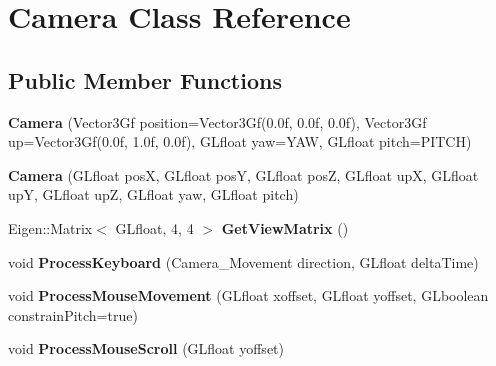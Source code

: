 \hypertarget{classCamera}{}\section{Camera Class Reference}
\label{classCamera}
\subsection*{Public Member Functions}
\begin{DoxyCompactItemize}
\item 
\mbox{\label{classCamera_a852d8c105b562be494204cac8518b66f}} 
{\bfseries Camera} (Vector3\+Gf position=Vector3\+Gf(0.\+0f, 0.\+0f, 0.\+0f), Vector3\+Gf up=\+Vector3\+Gf(0.\+0f, 1.\+0f, 0.\+0f), G\+Lfloat yaw=\+Y\+A\+W, G\+Lfloat pitch=\+P\+I\+T\+C\+H)
\item 
\mbox{\label{classCamera_a1efd973829c22d5fe15a26ede3357ee5}} 
{\bfseries Camera} (G\+Lfloat posX, G\+Lfloat posY, G\+Lfloat posZ, G\+Lfloat upX, G\+Lfloat upY, G\+Lfloat upZ, G\+Lfloat yaw, G\+Lfloat pitch)
\item 
\mbox{\label{classCamera_af040480b69b4235d9bd203bf6775e79a}} 
Eigen\+::\+Matrix$<$ G\+Lfloat, 4, 4 $>$ {\bfseries Get\+View\+Matrix} ()
\item 
\mbox{\label{classCamera_ac7e9a7f3e63c670fd695a8f03d02dbdf}} 
void {\bfseries Process\+Keyboard} (Camera\+\_\+\+Movement direction, G\+Lfloat delta\+Time)
\item 
\mbox{\label{classCamera_a97ffbf8d8935fc63bd2ca71a4268eec4}} 
void {\bfseries Process\+Mouse\+Movement} (G\+Lfloat xoffset, G\+Lfloat yoffset, G\+Lboolean constrain\+Pitch=true)
\item 
\mbox{\label{classCamera_af269e5ef38e791afb7f4a1dfb8da2399}} 
void {\bfseries Process\+Mouse\+Scroll} (G\+Lfloat yoffset)
\end{DoxyCompactItemize}
